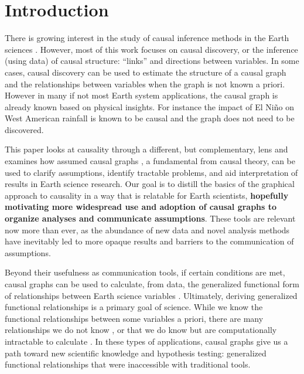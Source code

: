 \documentclass[12pt]{article}
\begin{document}
\section{Introduction}

There is growing interest in the study of causal inference methods in
the Earth sciences \citep[e.g.,][]{salvucci2002, ebert-uphoff2012,
  kretschmer2016,
  samarasinghe2020,runge-causal-timeseries,runge2019inferring,goodwell-causality-2020}. However,
most of this work focuses on causal discovery, or the inference (using
data) of causal structure: ``links'' and directions between
variables. In some cases, causal discovery can be used to estimate the
structure of a causal graph and the relationships between variables
when the graph is not known a priori. However in many if not most
Earth system applications, the causal graph is already known based on
physical insights. For instance the impact of El Ni\~{n}o on West
American rainfall is known to be causal and the graph does not need to
be discovered.

This paper looks at causality through a different, but complementary,
lens and examines how assumed causal graphs \citep{pearl1995causal}, a
fundamental from causal theory, can be used to clarify assumptions,
identify tractable problems, and aid interpretation of results in
Earth science research. Our goal is to distill
\citep[e.g.,][]{olah2017} the basics of the graphical approach to
causality in a way that is relatable for Earth scientists,
\textbf{hopefully motivating more widespread use and adoption of
  causal graphs to organize analyses and communicate
  assumptions}. These tools are relevant now more than ever, as the
abundance of new data and novel analysis methods have inevitably led
to more opaque results and barriers to the communication of
assumptions.

Beyond their usefulness as communication tools, if certain conditions
are met, causal graphs can be used to calculate, from data, the
generalized functional form of relationships between Earth science
variables \citep{pearl2009causality}. Ultimately, deriving generalized
functional relationships is a primary goal of science. While we know
the functional relationships between some variables a priori, there
are many relationships we do not know \citep[e.g., ecosystem scale
water and carbon fluxes;][]{massmann2019, zhou2019arid,
  zhou2019feedback, grossiord2020}, or that we do know but are
computationally intractable to calculate \citep[e.g., clouds and
microphysics at the global scale:][]{randall2003, gentine2018,
  zadra2018, gagne2020emulation}. In these types of applications,
causal graphs give us a path toward new scientific knowledge and
hypothesis testing: generalized functional relationships that were
inaccessible with traditional tools.
\end{document}
